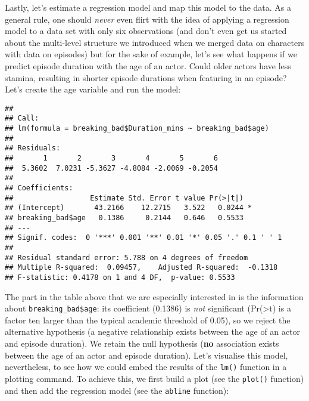 \documentclass[
]{article}
\newenvironment{Shaded}{\begin{snugshade}}{\end{snugshade}}
\newcommand{\CommentTok}[1]{\textcolor[rgb]{0.56,0.35,0.01}{\textit{#1}}}
\newcommand{\FunctionTok}[1]{\textcolor[rgb]{0.00,0.00,0.00}{#1}}
\newcommand{\NormalTok}[1]{#1}
\newcommand{\OtherTok}[1]{\textcolor[rgb]{0.56,0.35,0.01}{#1}}
\newcommand{\SpecialCharTok}[1]{\textcolor[rgb]{0.00,0.00,0.00}{#1}}
\newcommand{\StringTok}[1]{\textcolor[rgb]{0.31,0.60,0.02}{#1}}
\begin{document}
Lastly, let's estimate a regression model and map this model to the
data. As a general rule, one should \emph{never} even flirt with the
idea of applying a regression model to a data set with only six
observations (and don't even get us started about the multi-level
structure we introduced when we merged data on characters with data on
episodes) but for the sake of example, let's see what happens if we
predict episode duration with the age of an actor. Could older actors
have less stamina, resulting in shorter episode durations when featuring
in an episode? Let's create the age variable and run the model:

\begin{Shaded}
\end{Shaded}

\begin{verbatim}
## 
## Call:
## lm(formula = breaking_bad$Duration_mins ~ breaking_bad$age)
## 
## Residuals:
##       1       2       3       4       5       6 
##  5.3602  7.0231 -5.3627 -4.8084 -2.0069 -0.2054 
## 
## Coefficients:
##                  Estimate Std. Error t value Pr(>|t|)  
## (Intercept)       43.2166    12.2715   3.522   0.0244 *
## breaking_bad$age   0.1386     0.2144   0.646   0.5533  
## ---
## Signif. codes:  0 '***' 0.001 '**' 0.01 '*' 0.05 '.' 0.1 ' ' 1
## 
## Residual standard error: 5.788 on 4 degrees of freedom
## Multiple R-squared:  0.09457,    Adjusted R-squared:  -0.1318 
## F-statistic: 0.4178 on 1 and 4 DF,  p-value: 0.5533
\end{verbatim}

The part in the table above that we are especially interested in is the
information about \texttt{breaking\_bad\$age}: its coefficient (0.1386)
is \emph{not} significant (Pr(\textgreater\textbar t\textbar) is a
factor ten larger than the typical academic threshold of 0.05), so we
reject the alternative hypothesis (a negative relationship exists
between the age of an actor and episode duration). We retain the null
hypothesis (\textbf{no} association exists between the age of an actor
and episode duration). Let's visualise this model, nevertheless, to see
how we could embed the results of the \texttt{lm()} function in a
plotting command. To achieve this, we first build a plot (see the
\texttt{plot()} function) and then add the regression model (see the
\texttt{abline} function):
\end{document}
